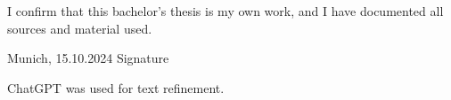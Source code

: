 \documentclass[pdftex,12pt,a4paper]{report}
\begin{document}
\noindent I confirm that this bachelor's thesis is my own work, and I have
documented all sources and material used.

\vspace{3cm}

\noindent Munich, 15.10.2024 \hfill Signature

\pagebreak

 \tableofcontents







\printbibliography

ChatGPT was used for text refinement.
\end{document}

